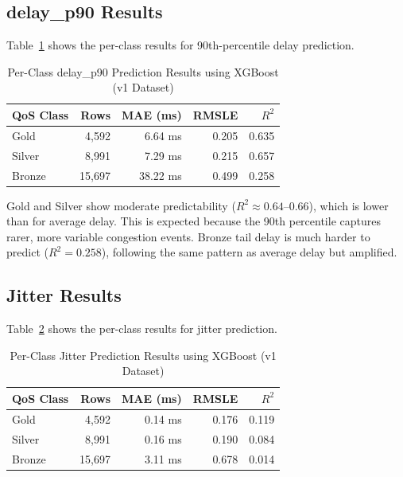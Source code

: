 \documentclass[a4paper,12pt]{Classes/RoboticsLaTeX}
\begin{document}
\subsection{delay\_p90 Results}

Table~\ref{tab:p90_results} shows the per-class results for 90th-percentile delay prediction.

\begin{table}[H]
\centering
\caption{Per-Class delay\_p90 Prediction Results using XGBoost (v1 Dataset)}
\label{tab:p90_results}
\begin{tabular}{|l|r|r|r|r|}
\hline
\textbf{QoS Class} & \textbf{Rows} & \textbf{MAE (ms)} & \textbf{RMSLE} & \textbf{$R^2$} \\
\hline
Gold & 4,592 & 6.64 ms & 0.205 & 0.635 \\
\hline
Silver & 8,991 & 7.29 ms & 0.215 & 0.657 \\
\hline
Bronze & 15,697 & 38.22 ms & 0.499 & 0.258 \\
\hline
\end{tabular}
\end{table}

Gold and Silver show moderate predictability ($R^2 \approx 0.64$--0.66), which is lower than for average delay. This is expected because the 90th percentile captures rarer, more variable congestion events. Bronze tail delay is much harder to predict ($R^2 = 0.258$), following the same pattern as average delay but amplified.

\subsection{Jitter Results}

Table~\ref{tab:jitter_results} shows the per-class results for jitter prediction.

\begin{table}[H]
\centering
\caption{Per-Class Jitter Prediction Results using XGBoost (v1 Dataset)}
\label{tab:jitter_results}
\begin{tabular}{|l|r|r|r|r|}
\hline
\textbf{QoS Class} & \textbf{Rows} & \textbf{MAE (ms)} & \textbf{RMSLE} & \textbf{$R^2$} \\
\hline
Gold & 4,592 & 0.14 ms & 0.176 & 0.119 \\
\hline
Silver & 8,991 & 0.16 ms & 0.190 & 0.084 \\
\hline
Bronze & 15,697 & 3.11 ms & 0.678 & 0.014 \\
\hline
\end{tabular}
\end{table}
\end{document}
